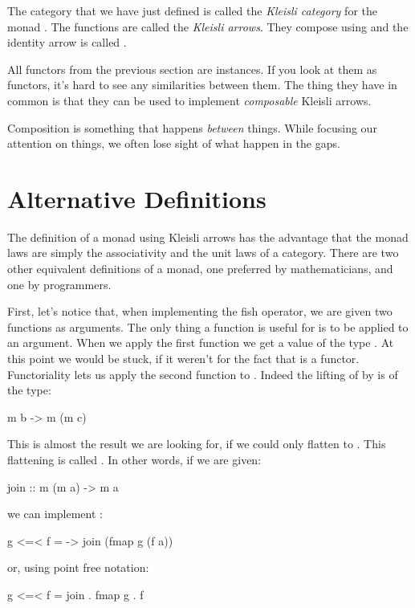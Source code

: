\documentclass[DaoFP]{subfiles}
\begin{document}
The category that we have just defined is called the \emph{Kleisli category} for the monad . The functions  are called the \emph{Kleisli arrows}. They compose using \hask{<=<} and the identity arrow is called .

All functors from the previous section are  instances. If you look at them as functors, it's hard to see any similarities between them. The thing they have in common is that they can be used to implement \emph{composable} Kleisli arrows. 

Composition is something that happens \emph{between} things. While focusing our attention on things, we often lose sight of what happen in the gaps. 

\section{Alternative Definitions}

The definition of a monad using Kleisli arrows has the advantage that the monad laws are simply the associativity and the unit laws of a category. There are two other equivalent definitions of a monad, one preferred by mathematicians, and one by programmers. 

First, let's notice that, when implementing the fish operator, we are given two functions as arguments. The only thing a function is useful for is to be applied to an argument. When we apply the first function  we get a value of the type . At this point we would be stuck, if it weren't for the fact that  is a functor. Functoriality lets us apply the second function  to . Indeed the lifting of  by  is of the type:
\begin{haskell}
m b -> m (m c)
\end{haskell}
This is almost the result we are looking for, if we could only flatten  to . This flattening is called . In other words, if we are given:
\begin{haskell}
join ::  m (m a) -> m a
\end{haskell}
we can implement \hask{<=<}:
\begin{haskell}
g <=< f = \a -> join (fmap g (f a))
\end{haskell}
or, using point free notation:
\begin{haskell}
g <=< f = join . fmap g . f
\end{haskell}
\end{document}
